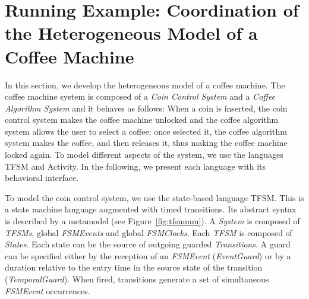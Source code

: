 \section{Running Example: Coordination of the Heterogeneous Model of a Coffee Machine}
\label{sec:runningexample}
In this section, we develop the heterogeneous model of a coffee machine. The coffee machine system is composed of a \emph{Coin Control System} and a \emph{Coffee Algorithm System} and it behaves as follows: When a coin is inserted, the coin control system makes the coffee machine unlocked and the coffee algorithm system allows the user to select a coffee; once selected it, the coffee algorithm system makes the coffee, and then releases it, thus making the coffee machine locked again. To model different aspects of the system, we use the languages TFSM and Activity. In the following, we present each language with its behavioral interface. %


To model the coin control system, we use the state-based language TFSM. This is a state machine language augmented with timed transitions. Its abstract syntax is described by a metamodel (see Figure~\ref{fig:tfsmmm}). A \emph{System} is composed of \emph{TFSMs}, global \emph{FSMEvents} and global \emph{FSMClocks}. Each \emph{TFSM} is composed of \emph{States}. Each state can be the source of outgoing guarded \emph{Transitions}. A guard can be specified either by the reception of an \emph{FSMEvent} (\emph{EventGuard}) or by a duration relative to the entry time in the source state of the transition (\emph{TemporalGuard}). When fired, transitions generate a set of simultaneous \emph{FSMEvent} occurrences.
	
